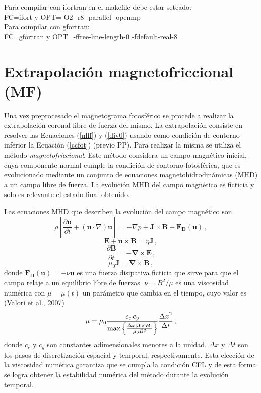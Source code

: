 \documentclass[a4paper,10pt]{article}
\def\bB{{\boldsymbol{B}}}
\def\bJ{{\boldsymbol{J}}}
\def\bu{{\boldsymbol{u}}}
\def\bE{{\boldsymbol{E}}}
\def\rot{\boldsymbol{\nabla \times}}
\def\dt#1{\frac{\partial #1}{\partial t}}
\def\bFd#1{\boldsymbol{F_D}(#1)}
\def\eq#1{Ecuación (\ref{#1})}
\def\eqs#1#2{Ecuaciones (\ref{#1}) y (\ref{#2})}
\begin{document}
Para compilar con ifortran en el makefile debe estar seteado:\\

FC=ifort y
OPT=-O2 -r8  -parallel -openmp \\

Para compilar con gfortran: \\

FC=gfortran y
OPT=-ffree-line-length-0 -fdefault-real-8


\section{Extrapolación magnetofriccional (MF)}
\label{mafex_sec}

Una vez preprocesado el magnetograma fotosférico se procede a realizar la extrapolación coronal libre de fuerza del mismo. La extrapolación consiste en resolver las \eqs{nlff}{div0} usando como condición de contorno inferior la \eq{ccfot} (previo PP). Para realizar la misma se utiliza el método \emph{magnetofriccional}. Este método considera un campo magnético inicial, cuya componente normal cumple la condición de contorno fotosférica, que es evolucionado mediante un conjunto de ecuaciones magnetohidrodinámicas (MHD)  a un campo libre de fuerza. La evolución MHD del campo magnético es ficticia y solo es relevante el estado final obtenido. 

Las ecuaciones MHD que describen la evolución del campo magnético son
\begin{equation}
\rho \left[\dt{\bu}+(\bu \cdot \nabla)\bu\right] = -\nabla p + {\bJ}\times {\bB} + \bFd{\bu} \,,
\label{euler}
\end{equation}
\begin{equation}
\bE +  {\bu}\times {\bB} = \eta \bJ \,,
\label{ohm}
\end{equation}
\begin{equation}
 \dt{\bB} = -\rot \bE \,,
 \label{faraday}
\end{equation}
\begin{equation}
 \mu_0 \bJ = \rot \bB  \,,
\label{rotor}
\end{equation}
donde $\bFd{\bu}= -\nu\bu$ es una fuerza disipativa ficticia que sirve para que el campo relaje a un equilibrio libre de fuerzas. $\nu = B^2/\mu$ es una viscosidad numérica con $\mu=\mu(t)$ un parámetro que cambia en el tiempo, cuyo valor es (Valori et al., 2007)
\begin{equation}
 \mu = \mu_0 \frac{c_c \, c_y}{{\rm max}\left\{{\frac{\Delta x|\bJ \times \bB|}{\mu_0 B^2}}\right\}} \frac{{\Delta x}^2}{\Delta t} \,,
\end{equation}
donde $c_c$ y $c_y$ son constantes adimensionales menores a la unidad. $\Delta x$ y $\Delta t$ son los pasos de discretización espacial y temporal, respectivamente. Esta elección de la viscosidad numérica garantiza que se cumpla la condición CFL y de esta forma se logra obtener la estabilidad numérica del método durante la evolución temporal. 
\end{document}
